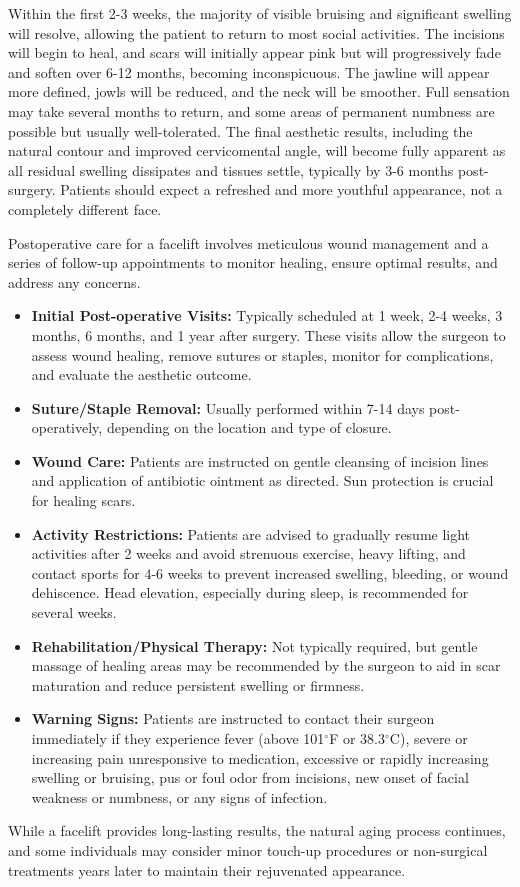 Within the first 2-3 weeks, the majority of visible bruising and significant swelling will resolve, allowing the patient to return to most social activities. The incisions will begin to heal, and scars will initially appear pink but will progressively fade and soften over 6-12 months, becoming inconspicuous. The jawline will appear more defined, jowls will be reduced, and the neck will be smoother. Full sensation may take several months to return, and some areas of permanent numbness are possible but usually well-tolerated. The final aesthetic results, including the natural contour and improved cervicomental angle, will become fully apparent as all residual swelling dissipates and tissues settle, typically by 3-6 months post-surgery. Patients should expect a refreshed and more youthful appearance, not a completely different face.

Postoperative care for a facelift involves meticulous wound management and a series of follow-up appointments to monitor healing, ensure optimal results, and address any concerns.

\begin{itemize}
  \item \textbf{Initial Post-operative Visits:} Typically scheduled at 1 week, 2-4 weeks, 3 months, 6 months, and 1 year after surgery. These visits allow the surgeon to assess wound healing, remove sutures or staples, monitor for complications, and evaluate the aesthetic outcome.
  \item \textbf{Suture/Staple Removal:} Usually performed within 7-14 days post-operatively, depending on the location and type of closure.
  \item \textbf{Wound Care:} Patients are instructed on gentle cleansing of incision lines and application of antibiotic ointment as directed. Sun protection is crucial for healing scars.
  \item \textbf{Activity Restrictions:} Patients are advised to gradually resume light activities after 2 weeks and avoid strenuous exercise, heavy lifting, and contact sports for 4-6 weeks to prevent increased swelling, bleeding, or wound dehiscence. Head elevation, especially during sleep, is recommended for several weeks.
  \item \textbf{Rehabilitation/Physical Therapy:} Not typically required, but gentle massage of healing areas may be recommended by the surgeon to aid in scar maturation and reduce persistent swelling or firmness.
  \item \textbf{Warning Signs:} Patients are instructed to contact their surgeon immediately if they experience fever (above 101$^{\circ}$F or 38.3$^{\circ}$C), severe or increasing pain unresponsive to medication, excessive or rapidly increasing swelling or bruising, pus or foul odor from incisions, new onset of facial weakness or numbness, or any signs of infection.
\end{itemize}
While a facelift provides long-lasting results, the natural aging process continues, and some individuals may consider minor touch-up procedures or non-surgical treatments years later to maintain their rejuvenated appearance.

